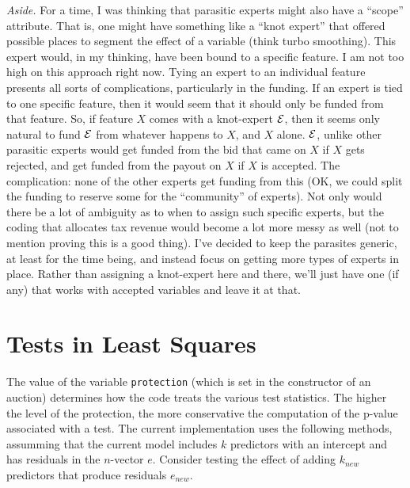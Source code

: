 \documentclass[12pt]{article}
\begin{document}
 {\em Aside.}  For a time, I was thinking that parasitic experts might also have
 a ``scope'' attribute.  That is, one might have something like a ``knot
 expert'' that offered possible places to segment the effect of a variable
 (think turbo smoothing).  This expert would, in my thinking, have been bound to
 a specific feature.  I am not too high on this approach right now.  Tying an
 expert to an individual feature presents all sorts of complications,
 particularly in the funding.  If an expert is tied to one specific feature,
 then it would seem that it should only be funded from that feature.  So, if
 feature $X$ comes with a knot-expert ${\cal E}$, then it seems only natural to
 fund $\cal E$ from whatever happens to $X$, and $X$ alone.  $\cal E$, unlike
 other parasitic experts would get funded from the bid that came on $X$ if $X$
 gets rejected, and get funded from the payout on $X$ if $X$ is accepted.  The
 complication: none of the other experts get funding from this (OK, we could
 split the funding to reserve some for the ``community'' of experts). Not only
 would there be a lot of ambiguity as to when to assign such specific experts,
 but the coding that allocates tax revenue would become a lot more messy as well
 (not to mention proving this is a good thing).  I've decided to keep the
 parasites generic, at least for the time being, and instead focus on getting
 more types of experts in place.  Rather than assigning a knot-expert here and
 there, we'll just have one (if any) that works with accepted variables and
 leave it at that.


\section{Tests in Least Squares} %

 The value of the variable {\tt protection} (which is set in the constructor of
 an auction) determines how the code treats the various test statistics.  The
 higher the level of the protection, the more conservative the computation of
 the p-value associated with a test.  The current implementation uses the
 following methods, assumming that the current model includes $k$ predictors
 with an intercept and has residuals in the $n$-vector $e$.  Consider testing
 the effect of adding $k_{new}$ predictors that produce residuals $e_{new}$.
\end{document}
